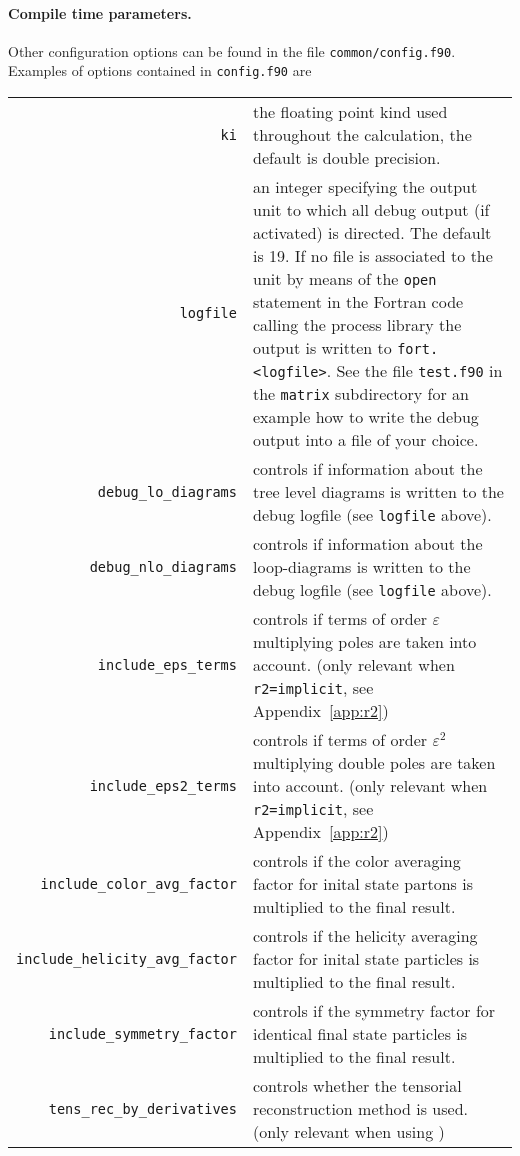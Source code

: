 \paragraph{Compile time parameters.}
Other configuration options can be found in the file \texttt{common/config.f90}.
\smallskip
Examples of options contained in \texttt{config.f90} are

\begin{longtable}{r p{}}
\texttt{ki} & the floating point kind used throughout the calculation, the default is double precision.\\
\texttt{logfile} & an integer specifying the output unit to which all debug output (if activated) is directed. The default is 19. If no file is associated to the unit by means of the \texttt{open} statement in the Fortran code calling the process library the output is written to \texttt{fort.<logfile>}. See the file \texttt{test.f90} in the \texttt{matrix} subdirectory for an example how to write the debug output into a file of your choice.\\
\texttt{debug\_lo\_diagrams} & controls if information about the
    tree level diagrams is written to the debug logfile (see \texttt{logfile} above).\\
\texttt{debug\_nlo\_diagrams} & controls if information about the
    loop-diagrams is written to the debug logfile (see \texttt{logfile} above).\\
\texttt{include\_eps\_terms} & controls if
    terms of order $\varepsilon$ multiplying
    poles are taken into account. (only relevant when \texttt{r2=implicit}, see Appendix~\ref{app:r2})\\
\texttt{include\_eps2\_terms} & controls if
    terms of order $\varepsilon^2$ multiplying
    double poles are taken into account. (only relevant when \texttt{r2=implicit}, see Appendix~\ref{app:r2})\\
\texttt{include\_color\_avg\_factor} & controls if the color averaging
    factor for inital state partons is multiplied to the final result.\\
\texttt{include\_helicity\_avg\_factor} & controls if the helicity averaging
    factor for inital state particles is multiplied to the final result.\\
\texttt{include\_symmetry\_factor} & controls if the symmetry
    factor for identical final state particles
    is multiplied to the final result. \\
\texttt{tens\_rec\_by\_derivatives} & controls whether the tensorial reconstruction method is used. (only relevant when using \golemVC{})
\end{longtable}

